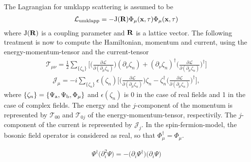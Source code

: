 %
The Lagrangian for umklapp scattering is assumed to be 
%
\begin{align}
	\mathcal{L}_{\mathrm{umklapp}}= -\mathrm{J}(\vb{R}) \Phi_{\mu}(\vb{x},\tau) \Phi_{\mu}(\vb{x},\tau)
\end{align}
%
where $\mathrm{J}(\vb{R})$ is a coupling parameter and $\vb{R}$ is a lattice vector.
The following treatment is now to compute the Hamiltonian, momentum and current, using the energy-momentum-tensor and the current-tensor
%
\begin{align}
	\mathcal{T}_{\mu\nu} = 
		\frac{1}{2} \sum\limits_{\{\zeta_{n}\}} \bigg[ 
		\Big(\frac{\partial\mathcal{L}}{\partial(\partial_{\mu}\zeta_{n})}\Big) (\partial_{\nu}\zeta_{n}) 
		+
		(\partial_{\nu}\zeta_{n})^{\dag} \Big(\frac{\partial\mathcal{L}}{\partial(\partial_{\mu}\zeta_{n})}\Big)^{\dag}
		\bigg]
\end{align}
%
%
\begin{align}
	\mathcal{J}_{\mu} = -i \sum\limits_{\{\zeta_{n}\}} \epsilon(\zeta_{n}) \bigg[
		\Big(\frac{\partial\mathcal{L}}{\partial(\partial_{\mu}\zeta_{n})}\Big) \zeta_{n}
		-
		\zeta_{n}^{\dag} \Big(\frac{\partial\mathcal{L}}{\partial(\partial_{\mu}\zeta_{n})}\Big)^{\dag}
		\bigg],
\end{align}
%
where $\{\zeta_{n}\} = \{\Psi_{\mathrm{a}},\Psi_{\mathrm{b}}, \Phi_{\mu}\}$ and $\epsilon(\zeta_{n})$ is 0 in the case of real fields and 1 in the case of complex fields.
The energy and the $j$-component of the momentum is represented by $\mathcal{T}_{00}$ and $\mathcal{T}_{0j}$ of the energy-momentum-tensor, respectivily.
The $j$-component of the current is represented by $\mathcal{J}_{j}$.
In the spin-fermion-model, the bosonic field operator is considered as real, so that $\Phi_{\mu}^{\dag} = \Phi_{\mu}$.



%
\begin{align}
	\Psi^{\dag} \big(\partial_{i}^{2} \Psi\big) = -\big(\partial_{i} \Psi^{\dag}\big) \big(\partial_{i} \Psi\big)
\end{align}
%








